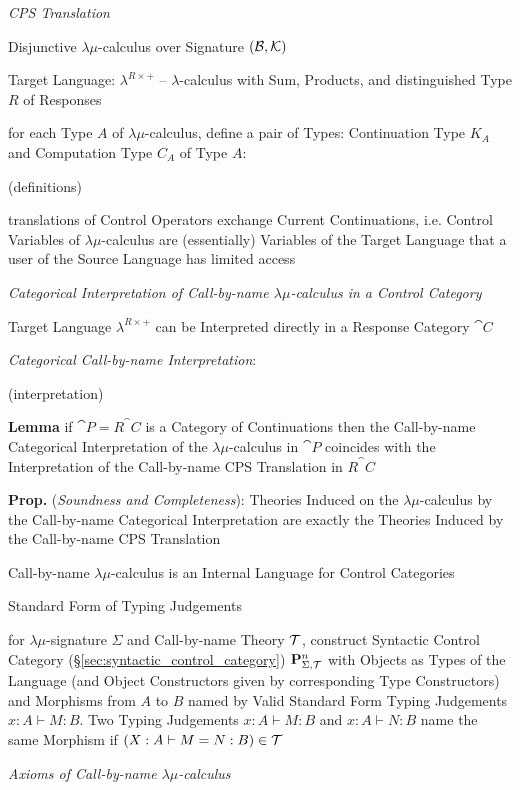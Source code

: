 \emph{CPS Translation}

Disjunctive $\lambda\mu$-calculus over Signature
$(\mathcal{B},\mathcal{K})$

Target Language: $\lambda^{R\times+}$ -- $\lambda$-calculus with Sum,
Products, and distinguished Type $R$ of Responses %

for each Type $A$ of $\lambda\mu$-calculus, define a pair of Types:
Continuation Type $K_A$ and Computation Type $C_A$ of Type $A$:

(definitions) %

translations of Control Operators exchange Current Continuations, i.e.
Control Variables of $\lambda\mu$-calculus are (essentially) Variables
of the Target Language that a user of the Source Language has limited
access %

\emph{Categorical Interpretation of Call-by-name $\lambda\mu$-calculus
  in a Control Category}

Target Language $\lambda^{R\times+}$ can be Interpreted directly in a
Response Category $\cat{C}$

\emph{Categorical Call-by-name Interpretation}:

(interpretation) %

\textbf{Lemma} if $\cat{P} = R^\cat{C}$ is a Category of Continuations
then the Call-by-name Categorical Interpretation of the
$\lambda\mu$-calculus in $\cat{P}$ coincides with the Interpretation
of the Call-by-name CPS Translation in $R^\cat{C}$

\textbf{Prop.} (\emph{Soundness and Completeness}): Theories Induced
on the $\lambda\mu$-calculus by the Call-by-name Categorical
Interpretation are exactly the Theories Induced by the Call-by-name
CPS Translation

Call-by-name $\lambda\mu$-calculus is an Internal Language for Control
Categories


Standard Form of Typing Judgements %

for $\lambda\mu$-signature $\Sigma$ and Call-by-name Theory
$\mathcal{T}$, construct Syntactic Control Category
(\S\ref{sec:syntactic_control_category})
$\mathbf{P}^n_{\Sigma,\mathcal{T}}$ with Objects as Types of the Language
(and Object Constructors given by corresponding Type Constructors) and
Morphisms from $A$ to $B$ named by Valid Standard Form Typing
Judgements $x:A \vdash M:B$. Two Typing Judgements $x:A \vdash M:B$
and $x:A \vdash N:B$ name the same Morphism if $(X:A \vdash M=N:B) \in
\mathcal{T}$


\emph{Axioms of Call-by-name $\lambda\mu$-calculus} %


